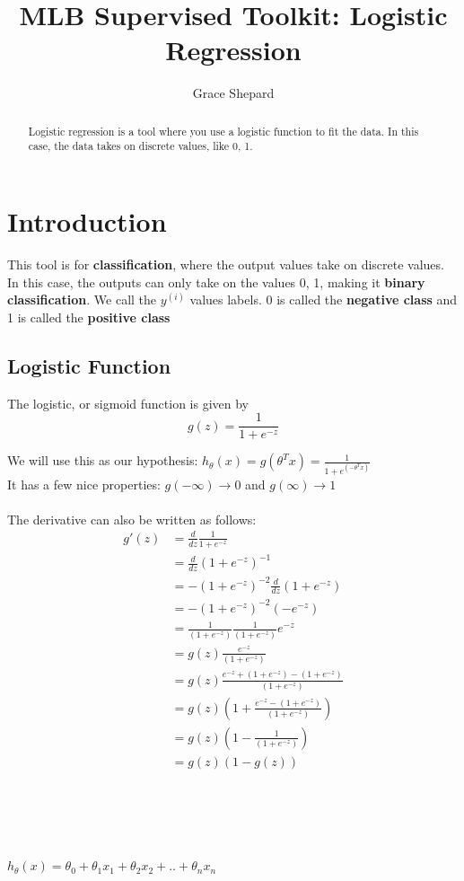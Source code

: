 \documentclass{article}
\begin{document}
\title{MLB Supervised Toolkit: Logistic Regression}
\author{Grace Shepard}

\maketitle

\begin{abstract}
Logistic regression is a tool where you use a logistic function to fit the data. In this case, the data takes on discrete values, like {0, 1}.
\end{abstract}


\section{Introduction}
This tool is for \textbf{classification}, where the output values take on discrete values. In this case, the outputs can only take on the values {0, 1}, making it \textbf{binary classification}. We call the $y^{(i)}$ values labels. 0 is called the \textbf{negative class} and 1 is called the \textbf{positive class}\\

\subsection{Logistic Function}
The logistic, or sigmoid function is given by
\begin{equation}
g(z) = \frac{1}{1+e^{-z}}
\end{equation}

We will use this as our hypothesis: $h_{\theta}(x) = g(\theta^Tx) = \frac{1}{1+e^{(-\theta^Tx)}}$
\\
It has a few nice properties: $g(-\infty) \rightarrow 0$ and $g(\infty) \rightarrow 1$
\\
\\
The derivative can also be written as follows:
\begin{align*}
g'(z) &= \frac{d}{dz}\frac{1}{1+e^{-z}}\\
&= \frac{d}{dz}{(1+e^{-z})}^{-1}\\
&= -{(1+e^{-z})}^{-2}\frac{d}{dz}(1+e^{-z})\\
&= -{(1+e^{-z})}^{-2}(-e^{-z})\\
&= \frac{1}{(1+e^{-z})}\frac{1}{(1+e^{-z})}e^{-z}\\
&= g(z)\frac{e^{-z}}{(1+e^{-z})}\\
&= g(z)\frac{e^{-z} + (1+e^{-z}) - (1+e^{-z})}{(1+e^{-z})}\\
&= g(z)(1+\frac{e^{-z} - (1+e^{-z})}{(1+e^{-z})})\\
&= g(z)(1-\frac{1}{(1+e^{-z})})\\
&= g(z)(1-g(z))\\
\end{align*}
\\
\\
\\
\\
\begin{center}
$h_{\theta}(x) = \theta_0 + \theta_1x_1 + \theta_2x_2 + .. + \theta_nx_n$\\
\end{center}
\end{document}
